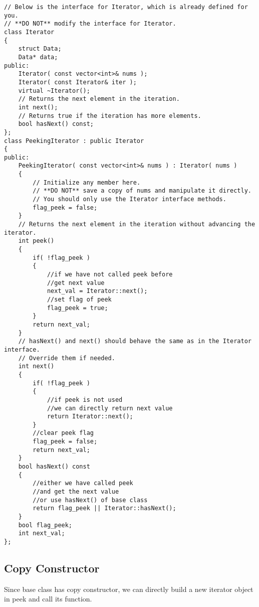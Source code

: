 \setcounter{lstlisting}{0}
\begin{lstlisting}[style=customc,caption={Flag}]
// Below is the interface for Iterator, which is already defined for you.
// **DO NOT** modify the interface for Iterator.
class Iterator
{
    struct Data;
    Data* data;
public:
    Iterator( const vector<int>& nums );
    Iterator( const Iterator& iter );
    virtual ~Iterator();
    // Returns the next element in the iteration.
    int next();
    // Returns true if the iteration has more elements.
    bool hasNext() const;
};
class PeekingIterator : public Iterator
{
public:
    PeekingIterator( const vector<int>& nums ) : Iterator( nums )
    {
        // Initialize any member here.
        // **DO NOT** save a copy of nums and manipulate it directly.
        // You should only use the Iterator interface methods.
        flag_peek = false;
    }
    // Returns the next element in the iteration without advancing the iterator.
    int peek()
    {
        if( !flag_peek )
        {
            //if we have not called peek before
            //get next value
            next_val = Iterator::next();
            //set flag of peek
            flag_peek = true;
        }
        return next_val;
    }
    // hasNext() and next() should behave the same as in the Iterator interface.
    // Override them if needed.
    int next()
    {
        if( !flag_peek )
        {
            //if peek is not used
            //we can directly return next value
            return Iterator::next();
        }
        //clear peek flag
        flag_peek = false;
        return next_val;
    }
    bool hasNext() const
    {
        //either we have called peek
        //and get the next value
        //or use hasNext() of base class
        return flag_peek || Iterator::hasNext();
    }
    bool flag_peek;
    int next_val;
};
\end{lstlisting}

\subsection{Copy Constructor}
Since base class  has copy constructor, we can directly build a new iterator object in peek and call its  function.


